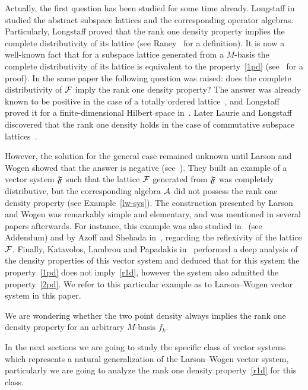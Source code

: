 \documentclass[12pt]{amsart}
\begin{document}
  Actually, the first question has been studied for some time already.
  Longstaff in~\cite{longstaff} studied the abstract subspace lattices and the corresponding operator algebras.
  Particularly, Longstaff proved that the rank one density property implies
    the complete distributivity of its lattice (see Raney~\cite{raney} for a definition).
  It is now a well-known fact that for a subspace lattice generated from a $M$-basis the complete distributivity of its lattice is equivalent to
    the property~\ref{1pd} (see~\cite{argyroslambrou} for a proof).
  In the same paper the following question was raised: does the complete distributivity of $\cal{F}$ imply the rank one density property?
  The answer was already known to be positive in the case of a totally ordered lattice~\cite{erdos}, and
    Longstaff proved it for a finite-dimensional Hilbert space in~\cite{longstaff}.
  Later Laurie and Longstaff discovered that the rank one density holds in the case of commutative subspace lattices~\cite{laurielongstaff}.

  However, the solution for the general case remained unknown until Larson and Wogen showed that the answer is negative (see~\cite{larson}).
  They built an example of a vector system $\fsys$ such that the lattice $\cal{F}$ generated from $\fsys$
    was completely distributive, but the corresponding algebra $\cal{A}$
    did not possess the rank one density property (see Example~\ref{lw-sys}).
  The construction presented by Larson and Wogen was remarkably simple and elementary, and was mentioned in several papers afterwards.
  For instance, this example was also studied in~\cite{argyroslambrou} (see Addendum) and by Azoff and Shehada in~\cite{azoff}, regarding
    the reflexivity of the lattice $\cal{F}$.
  Finally, Katavolos, Lambrou and Papadakis in~\cite{katavolos} performed a deep analysis of the density properties
    of this vector system and deduced that for this system the property~\ref{1pd} does not imply~\ref{r1d},
    however the system also admitted the property~\ref{2pd}.
  We refer to this particular example as to Larson--Wogen vector system in this paper.

  We are wondering whether the two point density always implies the rank one density property for an arbitrary $M$-basis $f_k$.

  In the next sections we are going to study the specific class of vector systems which represents a natural generalization of
    the Larson--Wogen vector system, particularly we are going to analyze the rank one density property~\ref{r1d} for this class.
\end{document}
